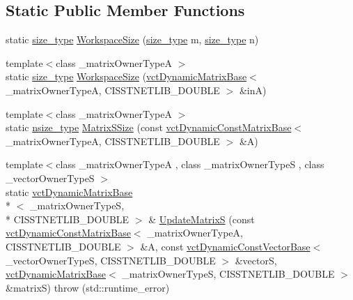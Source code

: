 \subsection*{Static Public Member Functions}
\begin{DoxyCompactItemize}
\item 
static \hyperlink{classnmr_s_v_d_dynamic_data_ae1d183124f1fe39da05af9cea168101d}{size\-\_\-type} \hyperlink{classnmr_s_v_d_dynamic_data_a26c2eb67f4481c071e7683998aef3799}{Workspace\-Size} (\hyperlink{classnmr_s_v_d_dynamic_data_ae1d183124f1fe39da05af9cea168101d}{size\-\_\-type} m, \hyperlink{classnmr_s_v_d_dynamic_data_ae1d183124f1fe39da05af9cea168101d}{size\-\_\-type} n)
\item 
{\footnotesize template$<$class \-\_\-matrix\-Owner\-Type\-A $>$ }\\static \hyperlink{classnmr_s_v_d_dynamic_data_ae1d183124f1fe39da05af9cea168101d}{size\-\_\-type} \hyperlink{classnmr_s_v_d_dynamic_data_a9dd6679bb22385b00165277c4e866fb5}{Workspace\-Size} (\hyperlink{classvct_dynamic_matrix_base}{vct\-Dynamic\-Matrix\-Base}$<$ \-\_\-matrix\-Owner\-Type\-A, C\-I\-S\-S\-T\-N\-E\-T\-L\-I\-B\-\_\-\-D\-O\-U\-B\-L\-E $>$ \&in\-A)
\item 
{\footnotesize template$<$class \-\_\-matrix\-Owner\-Type\-A $>$ }\\static \hyperlink{classnmr_s_v_d_dynamic_data_a3673bb17448a97213388b41ce36ef5b0}{nsize\-\_\-type} \hyperlink{classnmr_s_v_d_dynamic_data_a249bc6db62dbf3336f447f309ac05c7f}{Matrix\-S\-Size} (const \hyperlink{classvct_dynamic_const_matrix_base}{vct\-Dynamic\-Const\-Matrix\-Base}$<$ \-\_\-matrix\-Owner\-Type\-A, C\-I\-S\-S\-T\-N\-E\-T\-L\-I\-B\-\_\-\-D\-O\-U\-B\-L\-E $>$ \&A)
\item 
{\footnotesize template$<$class \-\_\-matrix\-Owner\-Type\-A , class \-\_\-matrix\-Owner\-Type\-S , class \-\_\-vector\-Owner\-Type\-S $>$ }\\static \hyperlink{classvct_dynamic_matrix_base}{vct\-Dynamic\-Matrix\-Base}\\*
$<$ \-\_\-matrix\-Owner\-Type\-S, \\*
C\-I\-S\-S\-T\-N\-E\-T\-L\-I\-B\-\_\-\-D\-O\-U\-B\-L\-E $>$ \& \hyperlink{classnmr_s_v_d_dynamic_data_a293914bccd0068243631c34d38089f94}{Update\-Matrix\-S} (const \hyperlink{classvct_dynamic_const_matrix_base}{vct\-Dynamic\-Const\-Matrix\-Base}$<$ \-\_\-matrix\-Owner\-Type\-A, C\-I\-S\-S\-T\-N\-E\-T\-L\-I\-B\-\_\-\-D\-O\-U\-B\-L\-E $>$ \&A, const \hyperlink{classvct_dynamic_const_vector_base}{vct\-Dynamic\-Const\-Vector\-Base}$<$ \-\_\-vector\-Owner\-Type\-S, C\-I\-S\-S\-T\-N\-E\-T\-L\-I\-B\-\_\-\-D\-O\-U\-B\-L\-E $>$ \&vector\-S, \hyperlink{classvct_dynamic_matrix_base}{vct\-Dynamic\-Matrix\-Base}$<$ \-\_\-matrix\-Owner\-Type\-S, C\-I\-S\-S\-T\-N\-E\-T\-L\-I\-B\-\_\-\-D\-O\-U\-B\-L\-E $>$ \&matrix\-S)  throw (std\-::runtime\-\_\-error)
\end{DoxyCompactItemize}
